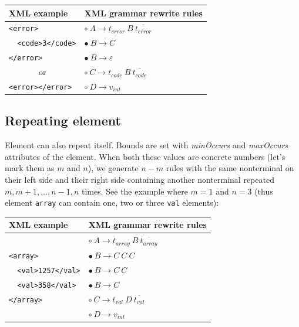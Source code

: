 \documentclass[12pt,notitlepage]{report}
\begin{document}
\begin{center}
\setlength{\tabcolsep}{0.5cm}
\renewcommand{\arraystretch}{1.3}
\begin{tabular}{|l|l|}
\hline
XML example & XML grammar rewrite rules \\ \hline
\texttt{<error>} & $\circ~A \rightarrow t_{error}~B~\overline{t_{error}}$ \\
\texttt{~~<code>3</code>} & $\bullet~B \rightarrow C$ \\
\texttt{</error>} & $\bullet~B \rightarrow \varepsilon$ \\
\multicolumn{1}{|c|}{or} & $\circ~C \rightarrow t_{code}~B~\overline{t_{code}}$ \\
\texttt{<error></error>} & $\circ~D \rightarrow v_{int}$ \\ \hline
\end{tabular}
\end{center}

\subsection{Repeating element}
\label{repeating-element}

Element can also repeat itself. Bounds are set with \textit{minOccurs} and \textit{maxOccurs} attributes of the element. When both these values are concrete numbers (let's mark them as $m$ and $n$), we generate $n-m$ rules with the same nonterminal on their left side and their right side containing another nonterminal repeated $m, m+1, ..., n-1, n$ times. See the example where $m=1$ and $n=3$ (thus element \texttt{array} can contain one, two or three \texttt{val} elements):

\begin{center}
\setlength{\tabcolsep}{0.5cm}
\renewcommand{\arraystretch}{1.3}
\begin{tabular}{|l|l|}
\hline
XML example & XML grammar rewrite rules \\ \hline
& $\circ~A \rightarrow  t_{array}~B~\overline{t_{array}}$ \\
\texttt{<array>} & $\bullet~B \rightarrow C~C~C$ \\
\texttt{~~<val>1257</val>} & $\bullet~B \rightarrow C~C$ \\
\texttt{~~<val>358</val>} & $\bullet~B \rightarrow C $ \\
\texttt{</array>} & $\circ~C \rightarrow t_{val}~D~\overline{t_{val}}$ \\
& $\circ~D \rightarrow v_{int}$ \\ \hline
\end{tabular}
\end{center}
\end{document}
